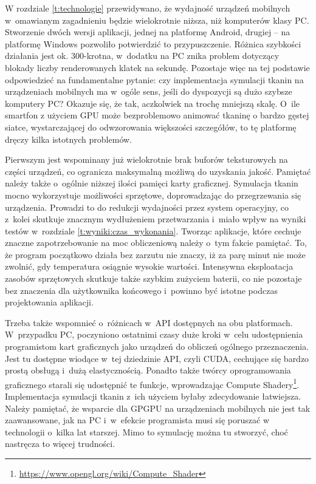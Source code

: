 	
	W rozdziale \ref{t:technologie} przewidywano, że wydajność urządzeń mobilnych w~omawianym zagadnieniu będzie wielokrotnie niższa, niż komputerów klasy PC. Stworzenie dwóch wersji aplikacji, jednej na platformę Android, drugiej -- na platformę Windows pozwoliło potwierdzić to przypuszczenie. Różnica szybkości działania jest ok. 300-krotna, w~dodatku na PC znika problem dotyczący blokady liczby renderowanych klatek na sekundę. Pozostaje więc na tej podstawie odpowiedzieć na fundamentalne pytanie: czy implementacja symulacji tkanin na urządzeniach mobilnych ma w~ogóle sens, jeśli do dyspozycji są dużo szybsze komputery PC? Okazuje się, że tak, aczkolwiek na trochę mniejszą skalę. O~ile smartfon z użyciem GPU może bezproblemowo animować tkaninę o bardzo gęstej siatce, wystarczającej do odwzorowania większości szczegółów, to tę platformę dręczy kilka istotnych problemów. 
	
	Pierwszym jest wspominany już wielokrotnie brak buforów teksturowych na części urządzeń, co ogranicza maksymalną możliwą do uzyskania jakość. Pamiętać należy także o~ogólnie niższej ilości pamięci karty graficznej. Symulacja tkanin mocno wykorzystuje możliwości sprzętowe, doprowadzając do przegrzewania się urządzenia. Prowadzi to do redukcji wydajności przez system operacyjny, co z~kolei skutkuje znacznym wydłużeniem przetwarzania i~miało wpływ na wyniki testów w~rozdziale \ref{t:wyniki:czas_wykonania}. Tworząc aplikacje, które cechuje znaczne zapotrzebowanie na moc obliczeniową należy o~tym fakcie pamiętać. To, że program początkowo działa bez zarzutu nie znaczy, iż za parę minut nie może zwolnić, gdy temperatura osiągnie wysokie wartości. Intensywna eksploatacja zasobów sprzętowych skutkuje także szybkim zużyciem baterii, co nie pozostaje bez znaczenia dla użytkownika końcowego i~powinno być istotne podczas projektowania aplikacji.
	
	Trzeba także wspomnieć o~różnicach w~API dostępnych na obu platformach. W~przypadku PC, poczyniono ostatnimi czasy duże kroki w~celu udostępnienia programistom kart graficznych jako urządzeń do obliczeń ogólnego przeznaczenia. Jest tu dostępne wiodące w~tej dziedzinie API, czyli CUDA, cechujące się bardzo prostą obsługą i~dużą elastycznością. Ponadto także twórcy oprogramowania graficznego starali się udostępnić te funkcje, wprowadzając Compute Shadery\footnote{\href{https://www.opengl.org/wiki/Compute\_Shader}{https://www.opengl.org/wiki/Compute\_Shader}}. Implementacja symulacji tkanin z~ich użyciem byłaby zdecydowanie łatwiejsza. Należy pamiętać, że wsparcie dla GPGPU na urządzeniach mobilnych nie jest tak zaawansowane, jak na PC i~w~efekcie programista musi się poruszać w technologii o~kilka lat starszej. Mimo to symulację można tu stworzyć, choć nastręcza to więcej trudności.
	
